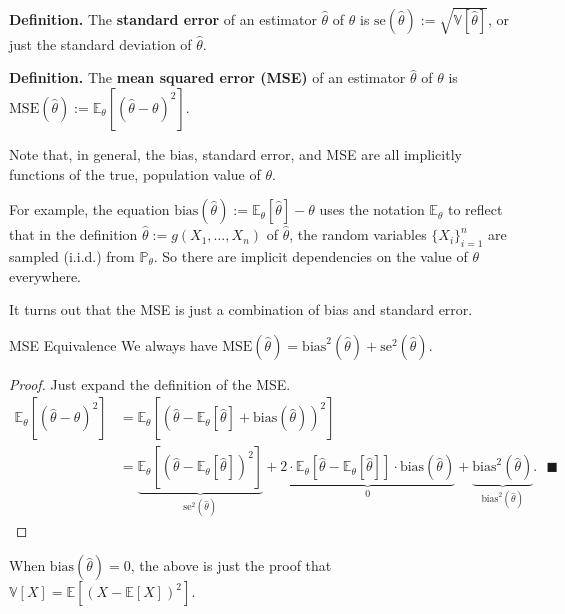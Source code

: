 \textbf{Definition.} The \textbf{standard error} of an estimator $\hat{\theta}$ of $\theta$
is $\mathrm{se}(\hat{\theta}) := \sqrt{\mathbb{V}[\hat{\theta}]}$, or just the
standard deviation of $\hat{\theta}$.

\textbf{Definition.} The \textbf{mean squared error (MSE)} of an estimator $\hat{\theta}$ of $\theta$
is $\mathrm{MSE}(\hat{\theta}) := \mathbb{E}_{\theta}[(\hat{\theta} - \theta)^2]$.

\begin{remark}
    Note that, in general, the bias, standard error, and MSE are all implicitly functions of
    the true, population value of $\theta$.

    For example, the equation $\mathrm{bias}(\hat{\theta}) := \mathbb{E}_{\theta}[\hat{\theta}] - \theta$
    uses the notation $\mathbb{E}_{\theta}$ to reflect that in the definition
    $\hat{\theta} := g(X_1, \dots, X_n)$ of $\hat{\theta}$,
    the random variables $\{X_i\}_{i = 1}^n$ are sampled (i.i.d.) from $\mathbb{P}_{\theta}$.
    So there are implicit dependencies on the value of $\theta$ everywhere.
\end{remark}

It turns out that the MSE is just a combination of bias and standard error.

\begin{theorem}{MSE Equivalence}
    We always have $\mathrm{MSE}(\hat{\theta}) =
    \mathrm{bias}^2(\hat{\theta}) + \mathrm{se}^2(\hat{\theta})$.
\end{theorem}

\begin{proof}
    Just expand the definition of the MSE.
    \begin{align*}
        \mathbb{E}_{\theta}[(\hat{\theta} - \theta)^2]
        & = \mathbb{E}_{\theta}[(
            \hat{\theta} - \mathbb{E}_{\theta}[\hat{\theta}] + \mathrm{bias}(\hat{\theta})
        )^2] \\
        & = \underbrace{\mathbb{E}_{\theta}[(\hat{\theta} - \mathbb{E}_{\theta}[\hat{\theta}])^2]}_{
            \mathrm{se}^2(\hat{\theta})
        } + \underbrace{2 \cdot \mathbb{E}_{\theta}[\hat{\theta} - \mathbb{E}_{\theta}[\hat{\theta}]]
        \cdot \mathrm{bias}(\hat{\theta})}_{
            0
        } + \underbrace{\mathrm{bias}^2(\hat{\theta})}_{\mathrm{bias}^2(\hat{\theta})}.
        ~~~ \blacksquare
    \end{align*}
\end{proof}

\begin{remark}
    When $\mathrm{bias}(\hat{\theta}) = 0$, the above is just
    the proof that $\mathbb{V}[X] = \mathbb{E}[(X - \mathbb{E}[X])^2]$.
\end{remark}

